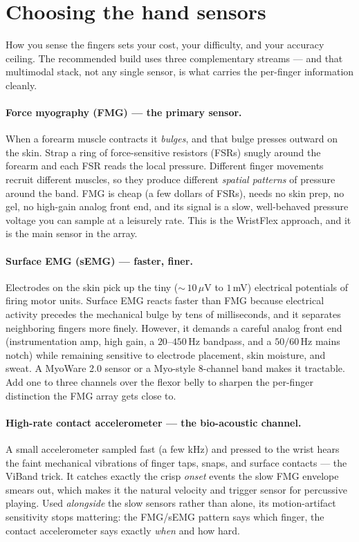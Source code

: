 \section{Choosing the hand sensors}
\label{ch41:sensor-choice}

How you sense the fingers sets your cost, your difficulty, and your accuracy
ceiling. The recommended build uses three complementary streams --- and that
multimodal stack, not any single sensor, is what carries the per-finger
information cleanly.

\paragraph{Force myography (FMG) --- the primary sensor.} When a forearm muscle
contracts it \emph{bulges}, and that bulge presses outward on the skin. Strap a
ring of force-sensitive resistors (FSRs) snugly around the forearm and each FSR
reads the local pressure. Different finger movements recruit different muscles,
so they produce different \emph{spatial patterns} of pressure around the band.
FMG is cheap (a few dollars of FSRs), needs no skin prep, no gel, no high-gain
analog front end, and its signal is a slow, well-behaved pressure voltage you can
sample at a leisurely rate. This is the WristFlex approach, and it is the
main sensor in the array.

\paragraph{Surface EMG (sEMG) --- faster, finer.} Electrodes on the skin pick up
the tiny ($\sim$\,$10\,\mu\text{V}$ to $1\,$mV) electrical potentials of firing motor
units. Surface EMG reacts faster than FMG because electrical activity precedes the mechanical
bulge by tens of milliseconds, and it separates neighboring fingers more finely.
However, it demands a careful analog front end (instrumentation amp, high gain, a
$20$--$450\,$Hz bandpass, and a $50/60\,$Hz mains notch) while remaining sensitive
to electrode placement, skin moisture, and sweat. A MyoWare 2.0 sensor or a
Myo-style 8-channel band makes it tractable. Add one to three channels over the
flexor belly to sharpen the per-finger distinction the FMG array gets close to.

\paragraph{High-rate contact accelerometer --- the bio-acoustic channel.} A
small accelerometer sampled fast (a few kHz) and pressed to the wrist hears the
faint mechanical vibrations of finger taps, snaps, and surface contacts ---
the ViBand trick. It catches exactly the crisp \emph{onset} events the slow FMG
envelope smears out, which makes it the natural velocity and trigger sensor for
percussive playing. Used \emph{alongside} the slow sensors rather than alone, its
motion-artifact sensitivity stops mattering: the FMG/sEMG pattern says which
finger, the contact accelerometer says exactly \emph{when} and how hard.


